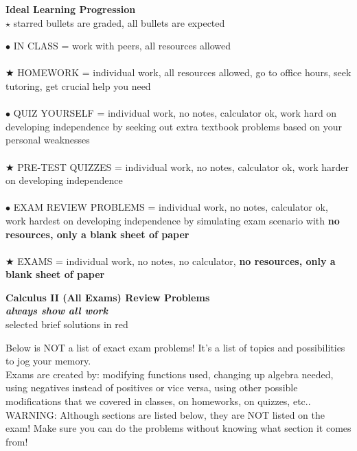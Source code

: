 \documentclass{exam}
\begin{document}
\begin{center}
{\bf Ideal Learning Progression}\\
$\star$ starred bullets are graded, all bullets are expected
\end{center}
$\bullet$  IN CLASS = work with peers, all resources allowed\\
 \ \\
 $\bigstar$ HOMEWORK  = individual work, all resources allowed, go to office hours, seek tutoring, get crucial help you need \\
 \ \\
$\bullet$ QUIZ YOURSELF = individual work, no notes, calculator ok, work hard on developing independence 
by seeking out extra textbook problems based on your personal weaknesses\\
\ \\
 $\bigstar$ PRE-TEST QUIZZES   = individual work, no notes, calculator ok, work harder on developing independence  \\
 \ \\
$\bullet$ EXAM REVIEW PROBLEMS = individual work, no notes, calculator ok, work hardest on developing independence
by simulating exam scenario with {\bf no resources, only a blank sheet of paper}\\
\ \\
 $\bigstar$ EXAMS  = individual work, no notes, no calculator, {\bf no resources, only a blank sheet of paper}\\




\begin{center}{\bf Calculus II (All Exams) Review Problems\\ {\it always show all work}
}\\  {\color{red} selected brief solutions in red} 
\end{center}

\noindent Below is NOT a list of exact exam problems!  It's a list of topics and possibilities to jog your memory.\\ Exams are created by:  modifying functions used, changing up algebra needed, using negatives instead of positives or vice versa, using other possible modifications that we covered in classes, on homeworks, on quizzes, etc..\\

\noindent WARNING:  Although sections are listed below, they are NOT listed on the exam!  Make sure you can do the problems without knowing what section it comes from!\\
\end{document}
